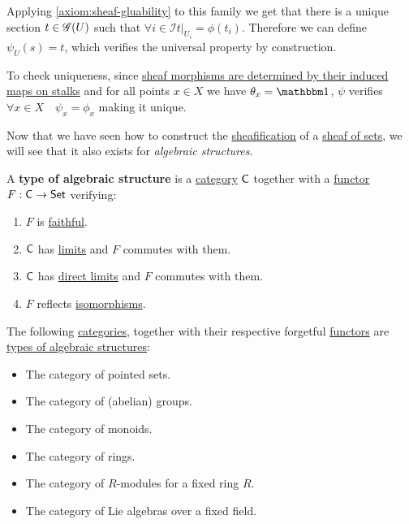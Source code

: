 \documentclass[../../../main]{subfiles}
\begin{document}
\begin{construction}
  Applying \ref{axiom:sheaf-gluability} to this family we get that there is a unique section \(t \in \mathscr{G}(U)\) such that \(\forall i \in \mathcal{I} t|_{U_{i}} = \phi(t_{i})\).
  Therefore we can define \(\psi_{U}(s) = t\), which verifies the universal property by construction.

  To check uniqueness, since \hyperref[prop:sheaf-morphism-and-stalks]{sheaf morphisms are determined by their induced maps on stalks} and for all points \(x \in X\) we have \(\theta_{x} = \id\), \(\psi\) verifies \(\forall x \in X \quad \psi_{x} = \phi_{x}\) making it unique.
\end{construction}

Now that we have seen how to construct the \hyperref[def:sheafification]{sheafification} of a \hyperref[def:set-valued-sheaf]{sheaf of sets}, we will see that it also exists for \textit{algebraic structures}.

\begin{definition}\label{def:algebraic-structure}
  A \textbf{type of algebraic structure} is a \hyperref[def:category]{category} \(\mathsf{C}\) together with a \hyperref[def:functor]{functor} \(F: \mathsf{C} \to \mathsf{Set}\) verifying:
  \begin{enumerate}
    \item \(F\) is \hyperref[def:functor-types]{faithful}.
    \item \(\mathsf{C}\) has \hyperref[def:categorical-limit]{limits} and \(F\) commutes with them.
    \item \(\mathsf{C}\) has \hyperref[def:direct-limit]{direct limits} and \(F\) commutes with them.
    \item \(F\) reflects \hyperref[def:categorical-isomorphism]{isomorphisms}.
  \end{enumerate}
\end{definition}

\begin{example}
  The following \hyperref[def:category]{categories}, together with their respective forgetful \hyperref[def:functor]{functors} are \hyperref[def:algebraic-structure]{types of algebraic structures}:
  \begin{itemize}
    \item The category of pointed sets.
    \item The category of (abelian) groups.
    \item The category of monoids.
    \item The category of rings.
    \item The category of \(R\)-modules for a fixed ring \(R\).
    \item The category of Lie algebras over a fixed field.
  \end{itemize}
\end{example}
\end{document}
